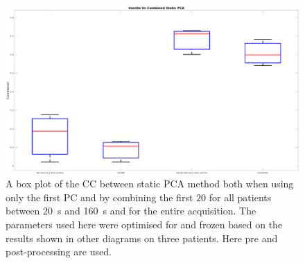             \begin{figure}
                \centering
                
                \includegraphics[width=1.0\linewidth]{figures/data_driven_surrogate_signal_extraction_results_1_box_plot_processed.png}
                
                \captionsetup{singlelinecheck=false, justification=centering}
                \caption{A box plot of the \gls{CC} between static \gls{PCA} method both when using only the first \gls{PC} and by combining the first $20$  for all patients between \SI{20}{\second} and \SI{160}{\second} and for the entire acquisition. The parameters used here were optimised for and frozen based on the results shown in other diagrams on three patients. Here pre and post-processing are used.}
                \label{fig:pca_data_driven_surrogate_signal_extraction_methods_for_dynamic_pet_results_box_plot_processed}
            \end{figure}
            
